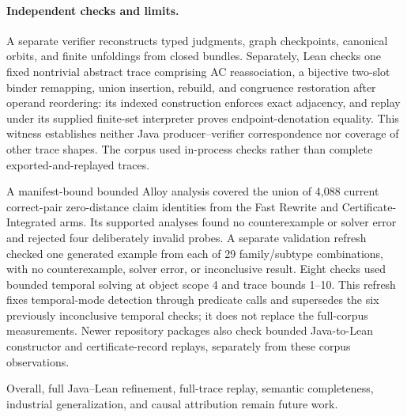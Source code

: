 \paragraph{Independent checks and limits.}
A separate verifier reconstructs typed judgments, graph checkpoints,
canonical orbits, and finite unfoldings from closed bundles.  Separately, Lean
checks one fixed nontrivial abstract trace comprising AC reassociation, a
bijective two-slot binder remapping, union insertion, rebuild, and congruence
restoration after operand reordering: its indexed construction enforces exact
adjacency, and replay under its supplied finite-set interpreter proves
endpoint-denotation equality.  This witness establishes neither Java
producer--verifier correspondence nor coverage of other trace shapes.  The
corpus used in-process
checks rather than complete exported-and-replayed traces.  

A manifest-bound
bounded Alloy analysis covered the union of 4,088 current correct-pair
zero-distance claim identities from the Fast Rewrite and
Certificate-Integrated arms. Its supported analyses found no counterexample
or solver error and rejected four deliberately invalid probes. A separate
validation refresh checked one generated example from each of 29
family/subtype combinations, with no counterexample, solver error, or
inconclusive result. Eight checks used bounded temporal solving at object
scope 4 and trace bounds 1--10. This refresh fixes temporal-mode detection
through predicate calls and supersedes the six previously inconclusive
temporal checks; it does not replace the full-corpus measurements.
Newer repository packages also check bounded Java-to-Lean constructor and
certificate-record replays, separately from these corpus observations. 

Overall, full Java--Lean refinement,
full-trace replay, semantic completeness, industrial generalization, and
causal attribution remain future work. 


